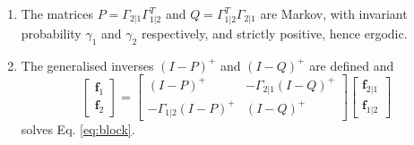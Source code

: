 \documentclass[12pt,a4paper]{amsart}
\begin{document}
\begin{proposition}
\begin{enumerate}
\item The matrices $P = \Gamma_{2|1}\Gamma_{1|2}^T$ and $Q = \Gamma_{1|2}^T\Gamma_{2|1}$ are Markov, with invariant probability $\gamma_1$ and $\gamma_2$ respectively, and strictly positive, hence ergodic.
\item The generalised inverses $(I-P)^+$ and $(I-Q)^+$ are defined and 
%
  \begin{equation*}
  \begin{bmatrix}
    \bm f_1 \\ \bm f_2
  \end{bmatrix}
=
    \begin{bmatrix}
      (I - P)^+ & - \Gamma_{2|1}(I - Q)^+ \\
- \Gamma_{1|2}(I-P)^+ & (I-Q)^+
    \end{bmatrix}
    \begin{bmatrix}
      \bm f_{2|1} \\ \bm f_{1|2}
    \end{bmatrix}
  \end{equation*}
%
solves Eq. \eqref{eq:block}.
\end{enumerate}
\end{proposition}
\end{document}
